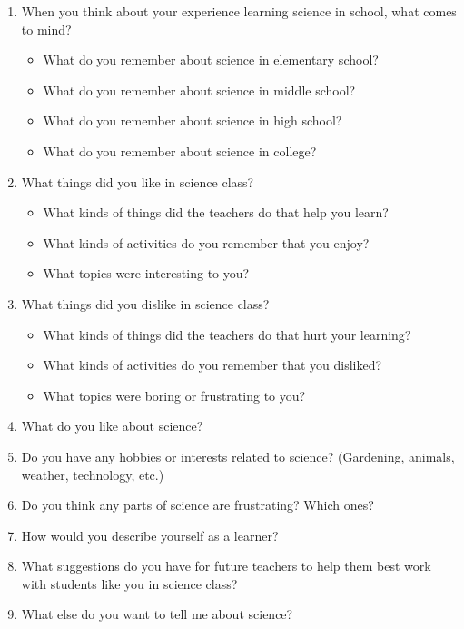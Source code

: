 \documentclass[11pt]{sig-alternate}
\begin{document}
\begin{large}
\begin{enumerate}
    \item When you think about your experience learning science in school, what comes to mind? 
    \begin{itemize}
       \item 	What do you remember about science in elementary school?
       \item What do you remember about science in middle school?
       \item What do you remember about science in high school?
      \item What do you remember about science in college?
    \end{itemize}
       \item What things did you like in science class?
    \begin{itemize}
       \item 	What kinds of things did the teachers do that help you learn?
       \item What kinds of activities do you remember that you enjoy?
       \item What topics were interesting to you?
    \end{itemize}
       \item What things did you dislike in science class?
    \begin{itemize}
        \item What kinds of things did the teachers do that hurt your learning?
       \item What kinds of activities do you remember that you disliked?
       \item What topics were boring or frustrating to you?
    \end{itemize}
   \item What do you like about science?
    \item Do you have any hobbies or interests related to science? (Gardening, animals, weather, technology, etc.)
    \item Do you think any parts of science are frustrating? Which ones?
    \item How would you describe yourself as a learner?
    \item What suggestions do you have for future teachers to help them best work with students like you in science class?
    \item What else do you want to tell me about science? 
\end{enumerate}


\end{large}
\end{document}
